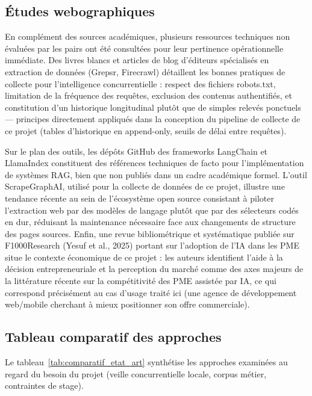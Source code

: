 \subsection{Études webographiques}

En complément des sources académiques, plusieurs ressources techniques non évaluées par les pairs ont été
consultées pour leur pertinence opérationnelle immédiate. Des livres blancs et articles de blog d'éditeurs
spécialisés en extraction de données (Grepsr, Firecrawl) détaillent les bonnes pratiques de collecte pour
l'intelligence concurrentielle : respect des fichiers robots.txt, limitation de la fréquence des requêtes,
exclusion des contenus authentifiés, et constitution d'un historique longitudinal plutôt que de simples
relevés ponctuels --- principes directement appliqués dans la conception du pipeline de collecte de ce projet
(tables d'historique en append-only, seuils de délai entre requêtes).

Sur le plan des outils, les dépôts GitHub des frameworks LangChain et LlamaIndex constituent des références
techniques de facto pour l'implémentation de systèmes RAG, bien que non publiés dans un cadre académique
formel. L'outil ScrapeGraphAI, utilisé pour la collecte de données de ce projet, illustre une tendance
récente au sein de l'écosystème open source consistant à piloter l'extraction web par des modèles de langage
plutôt que par des sélecteurs codés en dur, réduisant la maintenance nécessaire face aux changements de
structure des pages sources. Enfin, une revue bibliométrique et systématique publiée sur F1000Research
(Yesuf et al., 2025) \cite{yesuf2025} portant sur l'adoption de l'IA dans les PME situe le contexte
économique de ce projet : les auteurs identifient l'aide à la décision entrepreneuriale et la perception du
marché comme des axes majeurs de la littérature récente sur la compétitivité des PME assistée par IA, ce qui
correspond précisément au cas d'usage traité ici (une agence de développement web/mobile cherchant à mieux
positionner son offre commerciale).

\subsection{Tableau comparatif des approches}

Le tableau~\ref{tab:comparatif_etat_art} synthétise les approches examinées au regard du besoin du projet
(veille concurrentielle locale, corpus métier, contraintes de stage).

